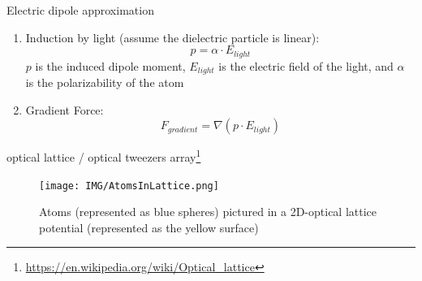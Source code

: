 \documentclass[18 pt]{beamer}
\begin{document}
\begin{frame}{Electric dipole approximation}
  \begin{enumerate}
    \item Induction by light (assume the dielectric particle is linear):
    \[p = \alpha \cdot E_{light}\]
    $p$ is the induced dipole moment, $E_{light}$ is the electric field of the light, and \(\alpha\) is the polarizability of the atom
    \item Gradient Force:
    \[F_{gradient} = \nabla (p \cdot E_{light})\]
  \end{enumerate}
\end{frame}
\begin{frame}{optical lattice / optical tweezers array\footnote{\url{https://en.wikipedia.org/wiki/Optical_lattice}}}
  \begin{figure}
    \texttt{[image: IMG/AtomsInLattice.png]}
    \caption{Atoms (represented as blue spheres) pictured in a 2D-optical lattice potential (represented as the yellow surface)}
  \end{figure}
\end{frame}
\end{document}
